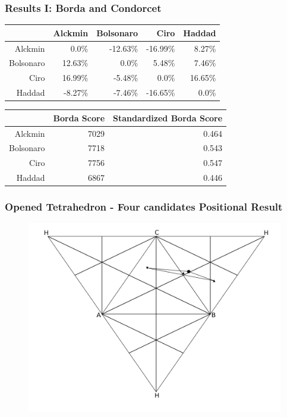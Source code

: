 \documentclass{beamer}
\begin{document}
\begin{frame}
  \frametitle{Results I: Borda and Condorcet}

\begin{table}[!h]
\centering
\begin{tabular}{rrrrr} & Alckmin & Bolsonaro & Ciro & Haddad \\\hline Alckmin &
  0.0\% & -12.63\% & -16.99\% & 8.27\% \\ Bolsonaro & 12.63\% & 0.0\% & 5.48\% &
  7.46\% \\ Ciro & 16.99\% & -5.48\% & 0.0\% & 16.65\% \\ Haddad & -8.27\% &
  -7.46\% & -16.65\% & 0.0\% \\\hline
          \end{tabular}
          \quad

\begin{tabular}{rrr} \hline & Borda Score & Standardized Borda Score\\ \hline
  Alckmin & 7029 & 0.464 \\ Bolsonaro & 7718 & 0.543 \\ Ciro & 7756 & 0.547\\
  Haddad & 6867 & 0.446 \\ \hline
\end{tabular}
\end{table}

\end{frame}

\begin{frame}
  \frametitle{Opened Tetrahedron - Four candidates Positional Result}
\begin{figure}[!h] \centering \includegraphics[width=\textwidth]{../images/opened_tetrahedron1.png}
 
\end{figure}

\end{frame}
\end{document}
